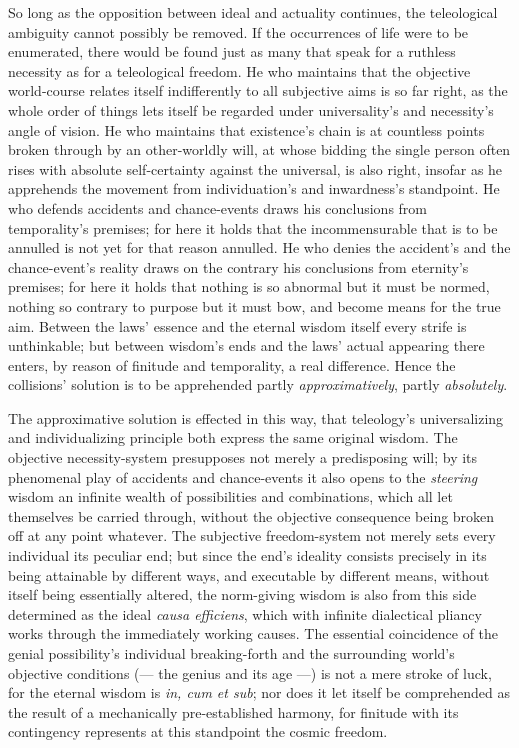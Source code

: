 \documentclass[12pt]{book}
\begin{document}
So long as the opposition between ideal and actuality continues, the
teleological ambiguity cannot possibly be removed. If the occurrences of
life were to be enumerated, there would be found just as many that speak for
a ruthless necessity as for a teleological freedom. He who maintains that
the objective world-course relates itself indifferently to all subjective
aims is so far right, as the whole order of things lets itself be regarded
under universality's and necessity's angle of vision. He who maintains that
existence's chain is at countless points broken through by an other-worldly
will, at whose bidding the single person often rises with absolute
self-certainty against the universal, is also right, insofar as he
apprehends the movement from individuation's and inwardness's standpoint. He
who defends accidents and chance-events draws his conclusions from
temporality's premises; for here it holds that the incommensurable that is
to be annulled is not yet for that reason annulled. He who denies the
accident's and the chance-event's reality draws on the contrary his
conclusions from eternity's premises; for here it holds that nothing is so
abnormal but it must be normed, nothing so contrary to purpose but it must
bow, and become means for the true aim. Between the laws' essence and the
eternal wisdom itself every strife is unthinkable; but between wisdom's ends
and the laws' actual appearing there enters, by reason of finitude and
temporality, a real difference. Hence the collisions' solution is to be
apprehended partly \emph{approximatively}, partly \emph{absolutely}.

The approximative solution is effected in this way, that teleology's
universalizing and individualizing principle both express the same original
wisdom. The objective necessity-system presupposes not merely a predisposing
will; by its phenomenal play of accidents and chance-events it also opens to
the \emph{steering} wisdom an infinite wealth of possibilities and
combinations, which all let themselves be carried through, without the
objective consequence being broken off at any point whatever. The subjective
freedom-system not merely sets every individual its peculiar end; but since
the end's ideality consists precisely in its being attainable by different
ways, and executable by different means, without itself being essentially
altered, the norm-giving wisdom is also from this side determined as the
ideal \textit{causa efficiens}, which with infinite dialectical pliancy
works through the immediately working causes. The essential coincidence of
the genial possibility's individual breaking-forth and the surrounding
world's objective conditions (--- the genius and its age ---) is not a mere
stroke of luck, for the eternal wisdom is \textit{in, cum et sub}; nor does
it let itself be comprehended as the result of a mechanically pre-established
harmony, for finitude with its contingency represents at this standpoint the
cosmic freedom.
\end{document}

